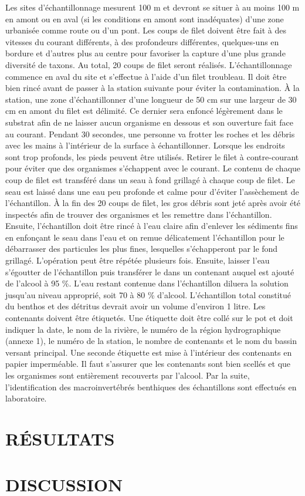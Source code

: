 \documentclass[]{glossa}
\begin{document}
Les sites d'échantillonnage mesurent 100 m et devront se situer à au
moins 100 m en amont ou en aval (si les conditions en amont sont
inadéquates) d'une zone urbanisée comme route ou d'un pont. Les coups de
filet doivent être fait à des vitesses du courant différents, à des
profondeurs différentes, quelques-uns en bordure et d'autres plus au
centre pour favoriser la capture d'une plus grande diversité de taxons.
Au total, 20 coups de filet seront réalisés. L'échantillonnage commence
en aval du site et s'effectue à l'aide d'un filet troubleau. Il doit
être bien rincé avant de passer à la station suivante pour éviter la
contamination. À la station, une zone d'échantillonner d'une longueur de
50 cm sur une largeur de 30 cm en amont du filet est délimité. Ce
dernier sera enfoncé légèrement dans le substrat afin de ne laisser
aucun organisme en dessous et son ouverture fait face au courant.
Pendant 30 secondes, une personne va frotter les roches et les débris
avec les mains à l'intérieur de la surface à échantillonner. Lorsque les
endroits sont trop profonds, les pieds peuvent être utilisés. Retirer le
filet à contre-courant pour éviter que des organismes s'échappent avec
le courant. Le contenu de chaque coup de filet est transféré dans un
seau à fond grillagé à chaque coup de filet. Le seau est laissé dans une
eau peu profonde et calme pour d'éviter l'assèchement de l'échantillon.
À la fin des 20 coups de filet, les gros débris sont jeté après avoir
été inspectés afin de trouver des organismes et les remettre dans
l'échantillon. Ensuite, l'échantillon doit être rincé à l'eau claire
afin d'enlever les sédiments fins en enfonçant le seau dans l'eau et on
remue délicatement l'échantillon pour le débarrasser des particules les
plus fines, lesquelles s'échapperont par le fond grillagé. L'opération
peut être répétée plusieurs fois. Ensuite, laisser l'eau s'égoutter de
l'échantillon puis transférer le dans un contenant auquel est ajouté de
l'alcool à 95 \%. L'eau restant contenue dans l'échantillon diluera la
solution jusqu'au niveau approprié, soit 70 à 80 \% d'alcool.
L'échantillon total constitué du benthos et des détritus devrait avoir
un volume d'environ 1 litre. Les contenants doivent être étiquetés. Une
étiquette doit être collé sur le pot et doit indiquer la date, le nom de
la rivière, le numéro de la région hydrographique (annexe 1), le numéro
de la station, le nombre de contenants et le nom du bassin versant
principal. Une seconde étiquette est mise à l'intérieur des contenants
en papier imperméable. Il faut s'assurer que les contenants sont bien
scellés et que les organismes sont entièrement recouverts par l'alcool.
Par la suite, l'identification des macroinvertébrés benthiques des
échantillons sont effectués en laboratoire.

\hypertarget{ruxe9sultats}{%
\section{RÉSULTATS}\label{ruxe9sultats}}

\hypertarget{discussion}{%
\section{DISCUSSION}\label{discussion}}

\renewcommand\refname{BIBLIOGRAPHIE}

\end{document}
